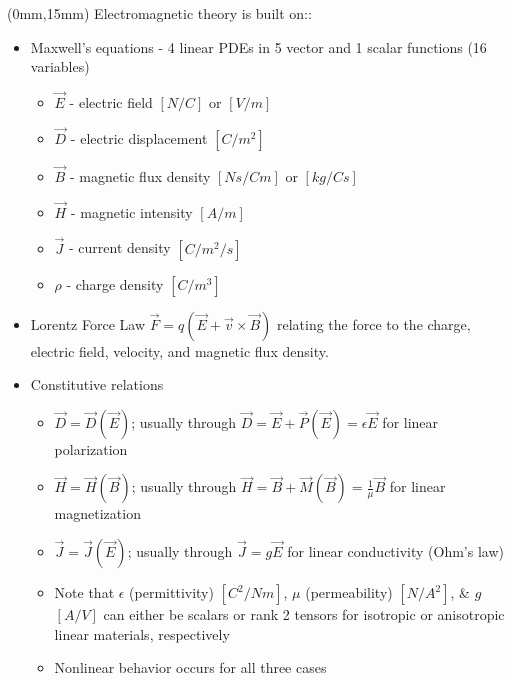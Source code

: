 \begin{textblock*}{75mm}(0mm,15mm)
\tiny
Electromagnetic theory is built on::
\begin{itemize} \itemsep1pt \parskip0pt 
\item Maxwell's equations - 4 linear PDEs in 5 vector and 1 scalar functions (16 variables)
    \begin{itemize} \itemsep1pt \parskip0pt 
    \item $\vec E$ - electric field $[N/C]$ or $[V/m]$
    \item $\vec D$ - electric displacement $[C/m^2]$
    \item $\vec B$ - magnetic flux density $[Ns/Cm]$ or $[kg/Cs]$
    \item $\vec H$ - magnetic intensity $[A/m]$
    \item $\vec J$ - current density $[C/m^2/s]$
    \item $\rho$ - charge density $[C/m^3]$
    \end{itemize}
\item Lorentz Force Law $\vec F = q \left( \vec E + \vec v \times \vec B \right)$ relating the force to 
      the charge, electric field, velocity, and magnetic flux density.
\item Constitutive relations
    \begin{itemize} \itemsep1pt \parskip0pt 
    \item $\vec D = \vec D(\vec E)$; usually through $\vec D = \vec E + \vec P (\vec E) = \epsilon \vec E$ for linear polarization
    \item $\vec H = \vec H(\vec B)$; usually through $\vec H = \vec B + \vec M (\vec B) = \frac{1}{\mu} \vec B$ for linear magnetization
    \item $\vec J = \vec J(\vec E)$; usually through $\vec J = g \vec E$ for linear conductivity (Ohm's law)
    \item Note that $\epsilon$ (permittivity) $[C^2/Nm]$, $\mu$ (permeability) $[N/A^2]$, \& $g$ $[A/V]$ can either be scalars or rank 2 tensors for isotropic 
          or anisotropic linear materials, respectively
    \item Nonlinear behavior occurs for all three cases
    \end{itemize}
\end{itemize}
\end{textblock*}




